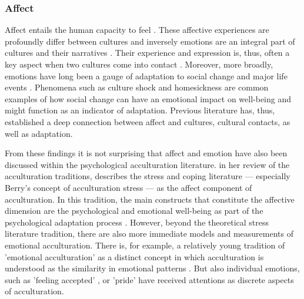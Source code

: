 \documentclass[man, 12pt, a4paper]{apa7}
\begin{document}
\subsubsection{Affect}
Affect entails the human capacity to feel \citep[including emotions and moods;][]{FeldmanBarrett2007}. These affective experiences are profoundly differ between cultures \citep[e.g.,][]{Holodynski2012, Boiger2018} and inversely emotions are an integral part of cultures and their narratives \citep{Ahmed2014, Kitayama1994, Smith2016c, Sundararajan2015}. Their experience and expression is, thus, often a key aspect when two cultures come into contact \citep[e.g.,][]{Iyer2008, Stephan1992}. Moreover, more broadly, emotions have long been a gauge of adaptation to social change and major life events \citep[e.g.,][]{Smith1990, Pacella2017}. Phenomena such as culture shock \citep{Ward2001a} and homesickness \citep{VanTilburg1996} are common examples of how social change can have an emotional impact on well-being and might function as an indicator of adaptation. Previous literature has, thus, established a deep connection between affect and cultures, cultural contacts, as well as adaptation.

From these findings it is not surprising that affect and emotion have also been discussed within the psychological acculturation literature. \citet{Ward2001} in her review of the acculturation traditions, describes the stress and coping literature --- especially Berry's concept of acculturation stress \citep{Berry1997b} --- as the affect component of acculturation. In this tradition, the main constructs that constitute the affective dimension are the psychological and emotional well-being as part of the psychological adaptation process \citep[including, for example life satisfaction and depression][]{Ward2019}. However, beyond the theoretical stress literature tradition, there are also more immediate models and measurements of emotional acculturation. There is, for example, a relatively young tradition of 'emotional acculturation' as a distinct concept in which acculturation is understood as the similarity in emotional patterns \citep[see][for a review]{DeLeersnyder2017}. But also individual emotions, such as 'feeling accepted' \citep{Jasini2018}, or 'pride' \citep{Suinn1995} have received attentions as discrete aspects of acculturation. 
\end{document}
